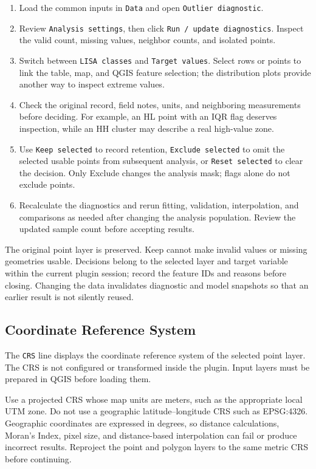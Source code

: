 \documentclass[11pt,a4paper]{article}
\begin{document}
\begin{enumerate}
    \item Load the common inputs in \texttt{Data} and open \texttt{Outlier diagnostic}.
    \item Review \texttt{Analysis settings}, then click \texttt{Run / update diagnostics}. Inspect the valid count, missing values, neighbor counts, and isolated points.
    \item Switch between \texttt{LISA classes} and \texttt{Target values}. Select rows or points to link the table, map, and QGIS feature selection; the distribution plots provide another way to inspect extreme values.
    \item Check the original record, field notes, units, and neighboring measurements before deciding. For example, an HL point with an IQR flag deserves inspection, while an HH cluster may describe a real high-value zone.
    \item Use \texttt{Keep selected} to record retention, \texttt{Exclude selected} to omit the selected usable points from subsequent analysis, or \texttt{Reset selected} to clear the decision. Only Exclude changes the analysis mask; flags alone do not exclude points.
    \item Recalculate the diagnostics and rerun fitting, validation, interpolation, and comparisons as needed after changing the analysis population. Review the updated sample count before accepting results.
\end{enumerate}

The original point layer is preserved. Keep cannot make invalid values or missing geometries usable. Decisions belong to the selected layer and target variable within the current plugin session; record the feature IDs and reasons before closing. Changing the data invalidates diagnostic and model snapshots so that an earlier result is not silently reused.


\subsection{Coordinate Reference System}

The \texttt{CRS} line displays the coordinate reference system of the selected point layer. The CRS is not configured or transformed inside the plugin. Input layers must be prepared in QGIS before loading them.

\begin{infobox}
Use a projected CRS whose map units are meters, such as the appropriate local UTM zone. Do not use a geographic latitude--longitude CRS such as EPSG:4326. Geographic coordinates are expressed in degrees, so distance calculations, Moran's Index, pixel size, and distance-based interpolation can fail or produce incorrect results. Reproject the point and polygon layers to the same metric CRS before continuing.
\end{infobox}
\end{document}
